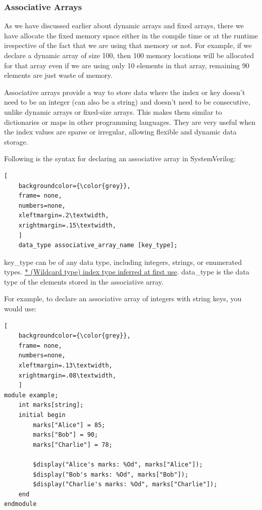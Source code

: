 \documentclass[12pt, a4paper]{article}
\begin{document}
\subsubsection{Associative Arrays}
As we have discussed earlier about dynamic arrays and fixed arrays, there we have allocate the fixed memory space either in the compile time or at the runtime irespective of the fact that we are using that memory or not. For example, if we declare a dynamic array of size 100, then 100 memory locations will be allocated for that array even if we are using only 10 elements in that array, remaining 90 elements are just waste of memory. 

\vspace{1em}

Associative arrays provide a way to store data where the index or key doesn't need to be an integer (can also be a string) and doesn't need to be consecutive, unlike dynamic arrays or fixed-size arrays. This makes them similar to dictionaries or maps in other programming languages. They are very useful when the index values are sparse or irregular, allowing flexible and dynamic data storage.

Following is the syntax for declaring an associative array in SystemVerilog:
\begin{lstlisting}[
    backgroundcolor={\color{grey}},
    frame= none,
    numbers=none,
    xleftmargin=.2\textwidth,
    xrightmargin=.15\textwidth, 
    ]
    data_type associative_array_name [key_type];
\end{lstlisting}

key\_type can be of any data type, including integers, strings, or enumerated types. \ul{* (Wildcard type) index type inferred at first use}.
data\_type is the data type of the elements stored in the associative array.

\vspace{0.5em}

For example, to declare an associative array of integers with string keys, you would use:
\begin{lstlisting}[
    backgroundcolor={\color{grey}},
    frame= none,
    numbers=none,
    xleftmargin=.13\textwidth,
    xrightmargin=.08\textwidth, 
    ]
module example;
    int marks[string];
    initial begin
        marks["Alice"] = 85;
        marks["Bob"] = 90;
        marks["Charlie"] = 78;
        
        $display("Alice's marks: %Od", marks["Alice"]);
        $display("Bob's marks: %Od", marks["Bob"]);
        $display("Charlie's marks: %Od", marks["Charlie"]);
    end
endmodule
\end{lstlisting}
\end{document}
